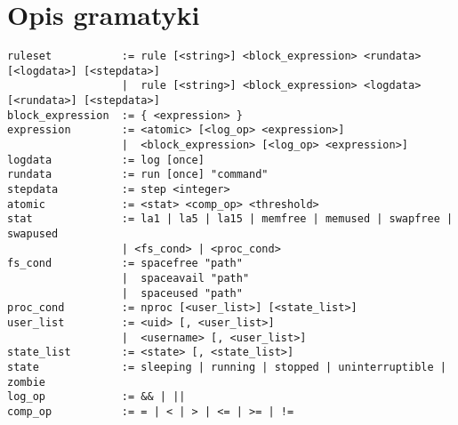\section{Opis gramatyki}

\label{gramatyka}
{\scriptsize \begin{verbatim}
ruleset           := rule [<string>] <block_expression> <rundata> [<logdata>] [<stepdata>]
                  |  rule [<string>] <block_expression> <logdata> [<rundata>] [<stepdata>]
block_expression  := { <expression> }
expression        := <atomic> [<log_op> <expression>]
                  |  <block_expression> [<log_op> <expression>]
logdata           := log [once]
rundata           := run [once] "command"
stepdata          := step <integer>
atomic            := <stat> <comp_op> <threshold>
stat              := la1 | la5 | la15 | memfree | memused | swapfree | swapused 
                  | <fs_cond> | <proc_cond>
fs_cond           := spacefree "path"
                  |  spaceavail "path"
                  |  spaceused "path"
proc_cond         := nproc [<user_list>] [<state_list>]
user_list         := <uid> [, <user_list>]
                  |  <username> [, <user_list>]
state_list        := <state> [, <state_list>]
state             := sleeping | running | stopped | uninterruptible | zombie
log_op            := && | ||
comp_op           := = | < | > | <= | >= | !=
\end{verbatim} }
